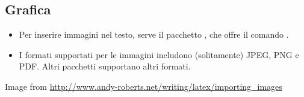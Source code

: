 \documentclass{beamer}
\begin{document}
\subsection{Grafica}
\begin{frame}[fragile]{\insertsubsection}
\begin{itemize}
\item Per inserire immagini nel testo, serve il pacchetto ,
che offre il comando .
\item I formati supportati per le immagini includono (solitamente)
JPEG, PNG e PDF. Altri pacchetti supportano altri formati.
\end{itemize}

\tiny{Image from \url{http://www.andy-roberts.net/writing/latex/importing_images}}
\end{frame}
\end{document}
